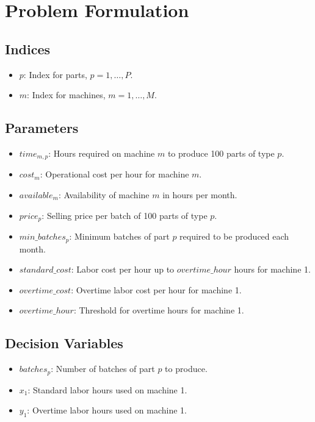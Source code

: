 \documentclass{article}
\begin{document}
\section*{Problem Formulation}

\subsection*{Indices}
\begin{itemize}
    \item $p$: Index for parts, $p = 1, \ldots, P$.
    \item $m$: Index for machines, $m = 1, \ldots, M$.
\end{itemize}

\subsection*{Parameters}
\begin{itemize}
    \item $time_{m,p}$: Hours required on machine $m$ to produce 100 parts of type $p$.
    \item $cost_{m}$: Operational cost per hour for machine $m$.
    \item $available_{m}$: Availability of machine $m$ in hours per month.
    \item $price_{p}$: Selling price per batch of 100 parts of type $p$.
    \item $min\_batches_{p}$: Minimum batches of part $p$ required to be produced each month.
    \item $standard\_cost$: Labor cost per hour up to $overtime\_hour$ hours for machine 1.
    \item $overtime\_cost$: Overtime labor cost per hour for machine 1.
    \item $overtime\_hour$: Threshold for overtime hours for machine 1.
\end{itemize}

\subsection*{Decision Variables}
\begin{itemize}
    \item $batches_{p}$: Number of batches of part $p$ to produce.
    \item $x_{1}$: Standard labor hours used on machine 1.
    \item $y_{1}$: Overtime labor hours used on machine 1.
\end{itemize}
\end{document}
